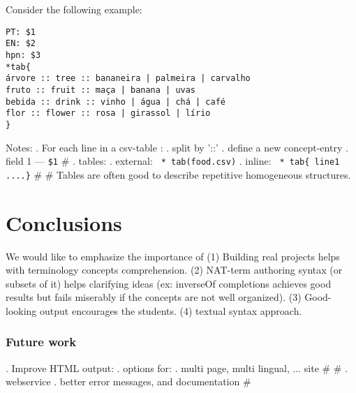 \documentclass{ceurart}
\begin{document}
Consider the following example:
\begin{Verbatim}
PT: $1
EN: $2
hpn: $3
*tab{
árvore :: tree :: bananeira | palmeira | carvalho
fruto :: fruit :: maça | banana | uvas
bebida :: drink :: vinho | água | chá | café
flor :: flower :: rosa | girassol | lírio
}
\end{Verbatim}
Notes:
. For each line in a csv-table :
    . split by '::'
    . define a new concept-entry
    . field 1 --- \verb|$1|
    #
. tables:
    . external: \verb' * tab(food.csv)'
    . inline: \verb' * tab{ line1 ....}'
    #
#
Tables are often good to describe repetitive homogeneous structures.

\section{Conclusions}

We would like to emphasize the importance of
 (1) Building real projects helps with terminology concepts comprehension.
 (2) NAT-term authoring syntax (or subsets of it) helps clarifying ideas (ex:
      inverseOf completions achieves good results but fails miserably if the concepts 
      are not well organized).
 (3) Good-looking output encourages the students.
 (4) textual syntax approach.

\subsubsection*{Future work}
\:
. Improve HTML output:
   . options for:
       . multi page, multi lingual, ... site
       #
   #
. webservice
. better error messages, and documentation
#



\end{document}
